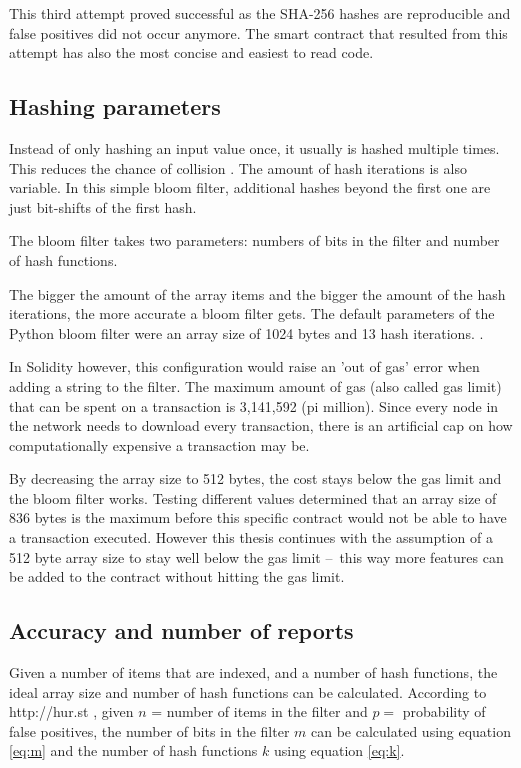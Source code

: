This third attempt proved successful as the SHA-256 hashes are reproducible and false positives did not occur anymore. The smart contract that resulted from this attempt has also the most concise and easiest to read code.

\subsection{Hashing parameters}

Instead of only hashing an input value once, it usually is hashed multiple times. This reduces the chance of collision \cite{MultipleHashes}. The amount of hash iterations is also variable. In this simple bloom filter, additional hashes beyond the first one are just bit-shifts of the first hash.

The bloom filter takes two parameters: numbers of bits in the filter and number of hash functions. 

The bigger the amount of the array items and the bigger the amount of the hash iterations, the more accurate a bloom filter gets. The default parameters of the Python bloom filter were an array size of 1024 bytes and 13 hash iterations. \cite{SimpleBloomFilter}.

In Solidity however, this configuration would raise an 'out of gas' error when adding a string to the filter. 
The maximum amount of gas (also called gas limit) that can be spent on a transaction is 3,141,592 (pi million). Since every node in the network needs to download every transaction, there is an artificial cap on how computationally expensive a transaction may be.

By decreasing the array size to 512 bytes, the cost stays below the gas limit and the bloom filter works. 
Testing different values determined that an array size of 836 bytes is the maximum before this specific contract would not be able to have a transaction executed. However this thesis continues with the assumption of a 512 byte array size to stay well below the gas limit – this way more features can be added to the contract without hitting the gas limit.

\subsection{Accuracy and number of reports}

Given a number of items that are indexed, and a number of hash functions, the ideal array size and number of hash functions can be calculated. According to http://hur.st \cite{BloomfilterAccuracy}, given $n$ = number of items in the filter and $p =$ probability of false positives, the number of bits in the filter $m$ can be calculated using equation \ref{eq:m} and the number of hash functions $k$ using equation \ref{eq:k}. 


